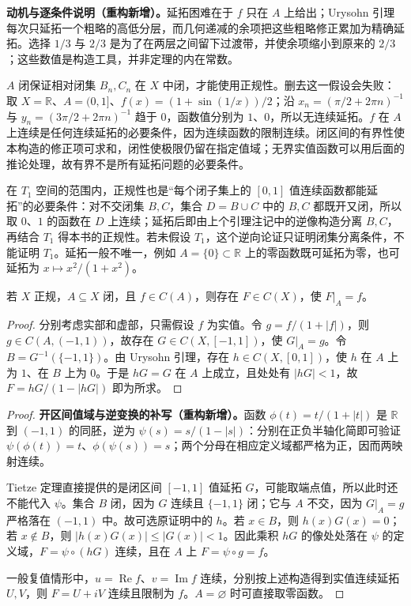 \documentclass[../../main.tex]{subfiles}%
\begin{document}
\begin{remark}
\textbf{动机与逐条件说明（重构新增）。}延拓困难在于 $f$ 只在 $A$ 上给出；Urysohn 引理每次只延拓一个粗略的高低分层，而几何递减的余项把这些粗略修正累加为精确延拓。选择 $1/3$ 与 $2/3$ 是为了在两层之间留下过渡带，并使余项缩小到原来的 $2/3$；这些数值是构造工具，并非定理的内在常数。

$A$ 闭保证相对闭集 $B_n,C_n$ 在 $X$ 中闭，才能使用正规性。删去这一假设会失败：取 $X=\mathbb R$、$A=(0,1]$、$f(x)=(1+\sin(1/x))/2$；沿 $x_n=(\pi/2+2\pi n)^{-1}$ 与 $y_n=(3\pi/2+2\pi n)^{-1}$ 趋于 $0$，函数值分别为 $1$、$0$，所以无连续延拓。$f$ 在 $A$ 上连续是任何连续延拓的必要条件，因为连续函数的限制连续。闭区间的有界性使本构造的修正项可求和，闭性使极限仍留在指定值域；无界实值函数可以用后面的推论处理，故有界不是所有延拓问题的必要条件。

在 $T_1$ 空间的范围内，正规性也是“每个闭子集上的 $[0,1]$ 值连续函数都能延拓”的必要条件：对不交闭集 $B,C$，集合 $D=B\cup C$ 中的 $B,C$ 都既开又闭，所以取 $0$、$1$ 的函数在 $D$ 上连续；延拓后即由上个引理注记中的逆像构造分离 $B,C$，再结合 $T_1$ 得本书的正规性。若未假设 $T_1$，这个逆向论证只证明闭集分离条件，不能证明 $T_1$。延拓一般不唯一，例如 $A=\{0\}\subset\mathbb R$ 上的零函数既可延拓为零，也可延拓为 $x\mapsto x^2/(1+x^2)$。
\end{remark}
\begin{corollary}\label{corollary:ch04-tietze-unbounded}
若 $X$ 正规，$A\subseteq X$ 闭，且 $f\in C(A)$，则存在 $F\in C(X)$，使 $F|_A=f$。
\end{corollary}
\begin{proof}
分别考虑实部和虚部，只需假设 $f$ 为实值。令 $g=f/(1+|f|)$，则 $g\in C(A,(-1,1))$，故存在 $G\in C(X,[-1,1])$，使 $G|_A=g$。令 $B=G^{-1}(\{-1,1\})$。由 Urysohn 引理，存在 $h\in C(X,[0,1])$，使 $h$ 在 $A$ 上为 $1$、在 $B$ 上为 $0$。于是 $hG=G$ 在 $A$ 上成立，且处处有 $|hG|<1$，故 $F=hG/(1-|hG|)$ 即为所求。
\end{proof}
\begin{proof}
\textbf{开区间值域与逆变换的补写（重构新增）。}函数 $\phi(t)=t/(1+|t|)$ 是 $\mathbb R$ 到 $(-1,1)$ 的同胚，逆为 $\psi(s)=s/(1-|s|)$：分别在正负半轴化简即可验证 $\psi(\phi(t))=t$、$\phi(\psi(s))=s$；两个分母在相应定义域都严格为正，因而两映射连续。

Tietze 定理直接提供的是闭区间 $[-1,1]$ 值延拓 $G$，可能取端点值，所以此时还不能代入 $\psi$。集合 $B$ 闭，因为 $G$ 连续且 $\{-1,1\}$ 闭；它与 $A$ 不交，因为 $G|_A=g$ 严格落在 $(-1,1)$ 中。故可选原证明中的 $h$。若 $x\in B$，则 $h(x)G(x)=0$；若 $x\notin B$，则 $|h(x)G(x)|\le|G(x)|<1$。因此乘积 $hG$ 的像处处落在 $\psi$ 的定义域，$F=\psi\circ(hG)$ 连续，且在 $A$ 上 $F=\psi\circ g=f$。

一般复值情形中，$u=\operatorname{Re}f$、$v=\operatorname{Im}f$ 连续，分别按上述构造得到实值连续延拓 $U,V$，则 $F=U+iV$ 连续且限制为 $f$。$A=\varnothing$ 时可直接取零函数。
\end{proof}
\end{document}
